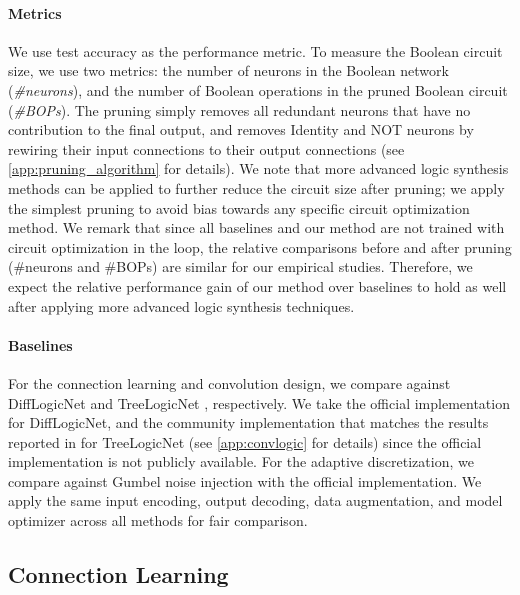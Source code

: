\paragraph{Metrics} We use test accuracy as the performance metric. To measure the Boolean circuit size, we use two metrics: the number of neurons in the Boolean network (\emph{\#neurons}), and the number of Boolean operations in the pruned Boolean circuit (\emph{\#BOPs}). 
The pruning simply removes all redundant neurons that
have no contribution to the final output,
 and removes Identity and NOT neurons by rewiring their input connections to their output connections (see \cref{app:pruning_algorithm} for details). 
We note that more advanced logic synthesis methods \citep{Mishchenko2006_DAGAwareRewriting, Brayton2010_ABC, Riener2019_OnTheFlyDAGAware, Li2024_DAGAwareSynthesisOrchestration} 
can be applied to 
further reduce the circuit size after pruning; we apply the simplest pruning to avoid bias towards any specific circuit optimization method. 
We remark that since all baselines and our method are not trained with circuit optimization in the loop, the relative comparisons before and after pruning (\ie \#neurons and \#BOPs) are similar for our empirical studies. 
Therefore, we expect the relative performance gain of our method over baselines to hold as well after applying more advanced logic synthesis techniques.

\paragraph{Baselines} For the connection learning and convolution design, we compare against DiffLogicNet \citep{petersen2022deep} and TreeLogicNet \citep{petersen2024convolutional}, respectively. 
We take the official implementation for DiffLogicNet, and the community implementation that 
matches the results reported in \citet{petersen2024convolutional} for TreeLogicNet (see \cref{app:convlogic} for details) since the official implementation is not publicly available. 
For the adaptive discretization, we compare against Gumbel noise injection \citep{yousefi2025mind} with the official implementation. 
We apply the same input encoding, output decoding, data augmentation, and model optimizer across all methods for fair comparison.

\subsection{Connection Learning} \label{sec:exp_connection}

